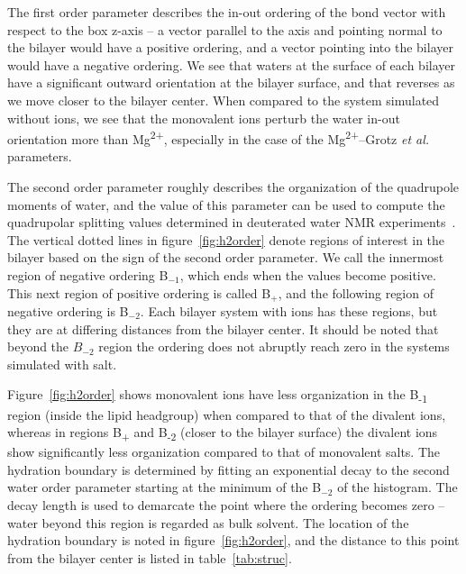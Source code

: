 \documentclass[journal=langd5,manuscript=article]{achemso}
\newcommand{\etal}{\textit{et al.}~}
\newcommand{\mgmicro}{Mg\textsuperscript{2+}--Grotz \etal}
\begin{document}
The first order parameter describes the in-out ordering of the bond vector with respect to the 
box z-axis -- a vector parallel to the axis and pointing normal to the bilayer would have a positive
ordering, and a vector pointing into the bilayer would have a negative ordering. We see that waters at the surface
of each bilayer have a significant outward orientation at the bilayer surface, and that reverses as we move
closer to the bilayer center. When compared to the system simulated without ions, we see that
the monovalent ions perturb the water in-out orientation 
more than Mg\textsuperscript{2+}, especially in the case of the \mgmicro
parameters.

The second order parameter
roughly describes the organization of the quadrupole moments of water, {and the value of this parameter
can be used to compute the} quadrupolar splitting values determined in 
deuterated water NMR experiments~\cite{aaman:2003,kruczek:2017:ether}.
The vertical dotted lines in figure~\ref{fig:h2order} denote regions of interest in the bilayer 
based on the {sign} of the second order parameter. We call the innermost region of negative ordering
B$_{-1}$, which ends when the values become positive. This next region of positive ordering is
called B$_{+}$, and the following region of negative ordering is B$_{-2}$. Each bilayer system with ions
has these regions, but they are at differing distances from the bilayer center.
It should be noted that beyond the $B_{-2}$ region the ordering does not abruptly reach zero in the systems
simulated with salt.

{
    Figure~\ref{fig:h2order} shows monovalent ions have 
    less organization in the B\textsubscript{-1} region (inside the lipid headgroup) when compared to that of the divalent ions,  
    whereas in regions B\textsubscript{+} and B\textsubscript{-2} (closer to the bilayer surface) the divalent ions show significantly
    less organization compared to that of monovalent salts.} 
The hydration boundary is determined by  
fitting an exponential decay to the second water order parameter starting
at the minimum of the B$_{-2}$ of the histogram.
The decay length is used to demarcate the point where the ordering becomes zero -- water beyond this region is
regarded as bulk solvent. The location of the hydration boundary 
is noted in figure~\ref{fig:h2order}, and the distance 
to this point from the bilayer center is listed in table~\ref{tab:struc}.
\end{document}
